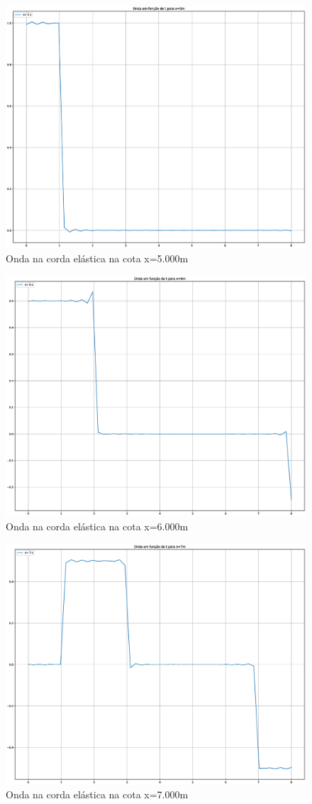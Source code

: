 \documentclass[12pt, a4paper, portuguese]{fphw}
\begin{document}
\begin{figure}[H]
	\centering
	\includegraphics[width=.8\linewidth]{"graficos/grafico_x=5.000m"}
	\caption{Onda na corda elástica na cota x=5.000m}
	\label{fig:grafico-x5}
\end{figure}

\begin{figure}[H]
	\centering
	\includegraphics[width=.8\linewidth]{"graficos/grafico_x=6.000m"}
	\caption{Onda na corda elástica na cota x=6.000m}
	\label{fig:grafico-x6}
\end{figure}

\begin{figure}[H]
	\centering
	\includegraphics[width=.8\linewidth]{"graficos/grafico_x=7.000m"}
	\caption{Onda na corda elástica na cota x=7.000m}
	\label{fig:grafico-x7}
\end{figure}
\end{document}

